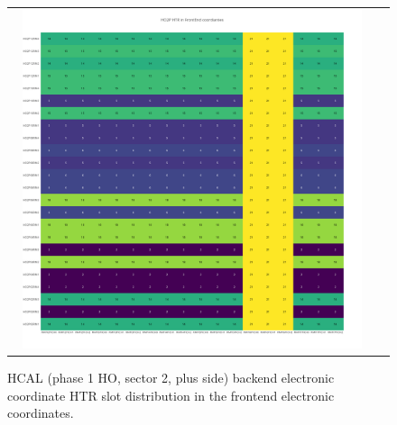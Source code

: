 \begin{figure}[htb]
 \begin{center}
  \begin{tabular}{cc}
   \includegraphics[angle=0,width=0.95\textwidth]{figures/appendix/HO2P_HTR_in_FrontEnd.png}
  \end{tabular}
  \caption{HCAL (phase 1 HO, sector 2, plus side) backend electronic coordinate HTR slot distribution in the frontend electronic coordinates.}
  \label{fig:lmapHO2PHTRFEC}
 \end{center}
\end{figure}
\clearpage

